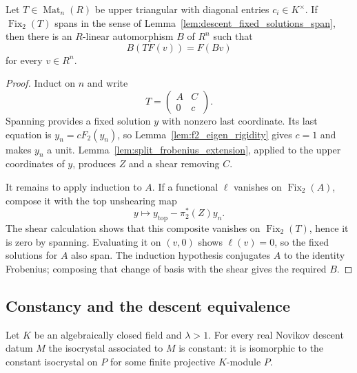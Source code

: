 \begin{lemma}
  \label{lem:triangular_frobenius_trivial}
  \leanok
  Let $T\in\operatorname{Mat}_n(R)$ be upper triangular with diagonal entries
  $c_i\in K^\times$.  If $\operatorname{Fix}_2(T)$ spans in the sense of
  Lemma~\ref{lem:descent_fixed_solutions_span}, then there is an
  $R$-linear automorphism $B$ of $R^n$ such that
  \[
    B(TF(v))=F(Bv)
  \]
  for every $v\in R^n$.
\end{lemma}

\begin{proof}
  \leanok
  Induct on $n$ and write
  \[
    T=\begin{pmatrix}A&C\\0&c\end{pmatrix}.
  \]
  Spanning provides a fixed solution $y$ with nonzero last coordinate.  Its
  last equation is $y_n=cF_2(y_n)$, so
  Lemma~\ref{lem:f2_eigen_rigidity} gives $c=1$ and makes $y_n$ a unit.
  Lemma~\ref{lem:split_frobenius_extension}, applied to the upper coordinates
  of $y$, produces $Z$ and a shear removing $C$.

  It remains to apply induction to $A$.  If a functional $\ell$ vanishes on
  $\operatorname{Fix}_2(A)$, compose it with the top unshearing map
  \[
    y\longmapsto y_{\mathrm{top}}-\pi_2^\ast(Z)y_n.
  \]
  The shear calculation shows that this composite vanishes on
  $\operatorname{Fix}_2(T)$, hence it is zero by spanning.  Evaluating it on
  $(v,0)$ shows $\ell(v)=0$, so the fixed solutions for $A$ also span.  The
  induction hypothesis conjugates $A$ to the identity Frobenius; composing
  that change of basis with the shear gives the required $B$.
\end{proof}

\subsection{Constancy and the descent equivalence}

\begin{theorem}
  \label{thm:descent_isoc_const_of_algclosed}
  \leanok
  Let $K$ be an algebraically closed field and $\lambda > 1$.  For every real
  Novikov descent datum $M$ the isocrystal associated to $M$ is constant: it is
  isomorphic to the constant isocrystal on $P$ for some finite projective
  $K$-module $P$.
\end{theorem}

